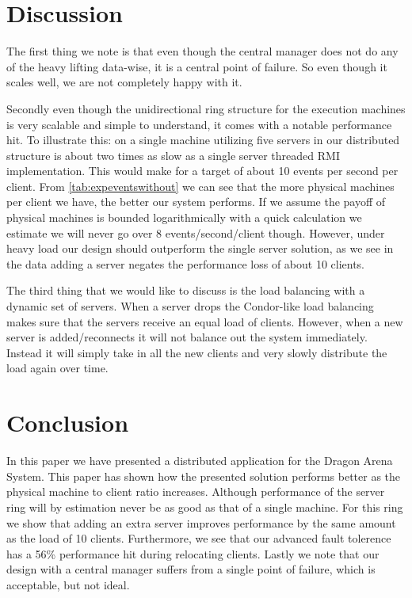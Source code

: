 \documentclass[a4paper,10pt]{article}
\begin{document}
\section{Discussion}
\label{sec:discussion}
The first thing we note is that even though the central manager does not do any of the heavy lifting data-wise, it is a central point of failure.
So even though it scales well, we are not completely happy with it.

Secondly even though the unidirectional ring structure for the execution machines is very scalable and simple to understand,
it comes with a notable performance hit.
To illustrate this: on a single machine utilizing five servers in our distributed structure is about two times as slow as a single server threaded RMI implementation.
This would make for a target of about 10 events per second per client.
From \autoref{tab:expeventswithout} we can see that the more physical machines per client we have, the better our system performs.
If we assume the payoff of physical machines is bounded logarithmically with a quick calculation we estimate we will never go over 8 events/second/client though.
However, under heavy load our design should outperform the single server solution, as we see in the data adding a server negates the performance
loss of about 10 clients.

The third thing that we would like to discuss is the load balancing with a dynamic set of servers.
When a server drops the Condor-like load balancing makes sure that the servers receive an equal load of clients.
However, when a new server is added/reconnects it will not balance out the system immediately.
Instead it will simply take in all the new clients and very slowly distribute the load again over time.

\section{Conclusion}
\label{sec:conclusion}
In this paper we have presented a distributed application for the Dragon Arena System.
This paper has shown how the presented solution performs better as the physical machine to client ratio increases.
Although performance of the server ring will by estimation never be as good as that of a single machine.
For this ring we show that adding an extra server improves performance by the same amount as the load of 10 clients.
Furthermore, we see that our advanced fault tolerence has a 56\% performance hit during relocating clients.
Lastly we note that our design with a central manager suffers from a single point of failure, which is acceptable, but not ideal.
\end{document}
